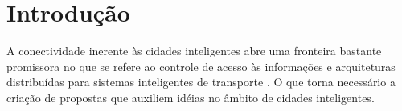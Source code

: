 \documentclass[
	12pt,				%
	oneside,			%
	a4paper,			%
	english,			%
	brazil				%
	]{abntex2ppgsi}
\begin{document}
\begin{siglas}
\end{siglas}

%
% 

\tableofcontents*
\cleardoublepage



\textual



% 
%
%
\chapter{Introdução}


A conectividade inerente às cidades inteligentes abre uma fronteira bastante promissora no que se refere ao controle de acesso às informações \cite{li2010travel} \cite{zhu2015intelligent} e arquiteturas distribuídas para sistemas inteligentes de transporte \cite{ice2001regional}. O que torna necessário a criação de propostas que auxiliem idéias no âmbito de cidades inteligentes.
\end{document}
